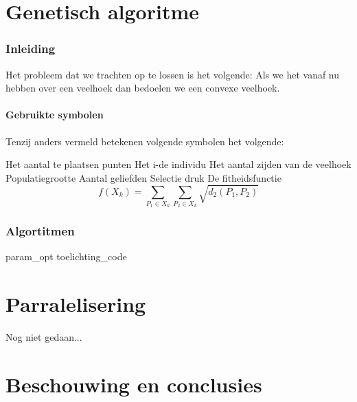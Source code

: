 \part{Genetisch algoritme}
\section{Inleiding}
\label{sec:inleiding}
Het probleem dat we trachten op te lossen is het volgende: %
Als we het vanaf nu hebben over een veelhoek dan bedoelen we een convexe veelhoek.

\subsection{Gebruikte symbolen}
Tenzij anders vermeld betekenen volgende symbolen het volgende:
\begin{itemize}
 Het aantal te plaatsen punten
 Het i-de individu 
 Het aantal zijden van de veelhoek
 Populatiegrootte
 Aantal geliefden
 Selectie druk 
 De fitheidsfunctie \[f(X_k)= \sum_{P_1 \in X_k}\sum_{P_2 \in X_k} \sqrt{d_2(P_1,P_2)} \]
\end{itemize}



\section{Algortitmen}









 {param_opt}
 {toelichting_code}


\part{Parralelisering}
Nog niet gedaan...

\part{Beschouwing en conclusies}


